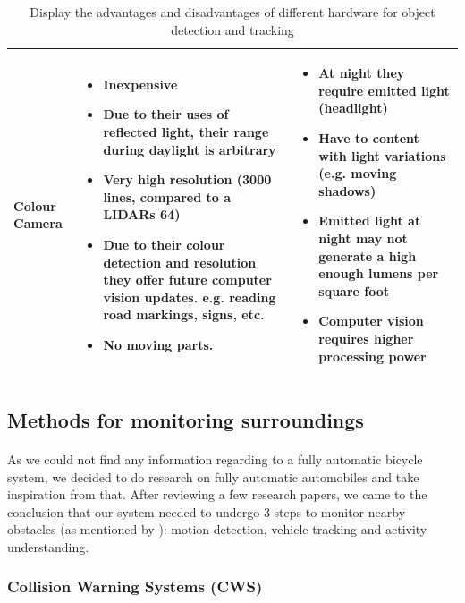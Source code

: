 \documentclass[a4paper]{report}
\begin{document}
\begin{table}[H]
{\begin{minipage}{\textwidth}
\begin{tabular}{ | m{3cm} | p{5cm} | p{5cm} |}
  Colour Camera &
  \begin{itemize}[leftmargin=*]   
    \item Inexpensive
    \item Due to their uses of reflected light, their range during daylight is arbitrary     	
    \item Very high resolution (3000 lines, compared to a LIDARs 64)    	
    \item Due to their colour detection and resolution they offer future computer vision updates. e.g. reading road markings, signs, etc.    	
    \item No moving parts.
  \end{itemize} &
  \begin{itemize}[leftmargin=*]   
    \item At night they require emitted light (headlight)
    \item Have to content with light variations (e.g. moving shadows)
    \item Emitted light at night may not generate a high enough lumens per square foot
    \item Computer vision requires higher processing power      
  \end{itemize} \\ \hline    
\end{tabular}


\caption[Table caption text]{Display the advantages and disadvantages of different hardware for object detection and tracking} 
\label{table:detect_hardware_comp}
\end{minipage} }
\end{table}

\subsection{Methods for monitoring surroundings}
\paragraph{} As we could not find any information regarding to a fully automatic bicycle system, we decided to do research on fully automatic automobiles and take inspiration from that. After reviewing a few research papers, we came to the conclusion that our system needed to undergo 3 steps to monitor nearby obstacles (as mentioned by \cite{prediction_3D_vehicle_tracking}): motion detection, vehicle tracking and activity understanding.

\subsubsection{Collision Warning Systems (CWS)}
\end{document}
